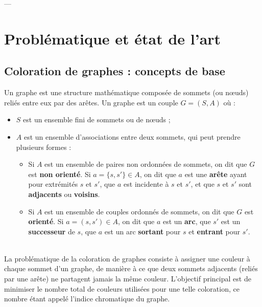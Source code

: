 \documentclass[11pt]{article}
\begin{document}
---

\section{Problématique et état de l'art}

\subsection{Coloration de graphes : concepts de base}

Un graphe est une structure mathématique composée de sommets (ou nœuds) reliés entre eux par des arêtes. Un graphe est un couple \( G = (S, A) \) où :
\begin{itemize}
    \item \( S \) est un ensemble fini de sommets ou de nœuds ;
    \item \( A \) est un ensemble d’associations entre deux sommets, qui peut prendre plusieurs formes :
    \begin{itemize}
        \item Si \( A \) est un ensemble de paires non ordonnées de sommets, on dit que \( G \) est \textbf{non orienté}. Si \( a = \{s, s'\} \in A \), on dit que \( a \) est une \textbf{arête} ayant pour extrémités \( s \) et \( s' \), que \( a \) est incidente à \( s \) et \( s' \), et que \( s \) et \( s' \) sont \textbf{adjacents} ou \textbf{voisins}.
        \item Si \( A \) est un ensemble de couples ordonnés de sommets, on dit que \( G \) est \textbf{orienté}. Si \( a = (s, s') \in A \), on dit que \( a \) est un \textbf{arc}, que \( s' \) est un \textbf{successeur} de \( s \), que \( a \) est un arc \textbf{sortant} pour \( s \) et \textbf{entrant} pour \( s' \). \cite{graph_theory_course}
    \end{itemize}
\end{itemize} \\

La problématique de la coloration de graphes consiste à assigner une couleur à chaque sommet d'un graphe, de manière à ce que deux sommets adjacents (reliés par une arête) ne partagent jamais la même couleur. L'objectif principal est de minimiser le nombre total de couleurs utilisées pour une telle coloration, ce nombre étant appelé l'indice chromatique du graphe.
\end{document}
